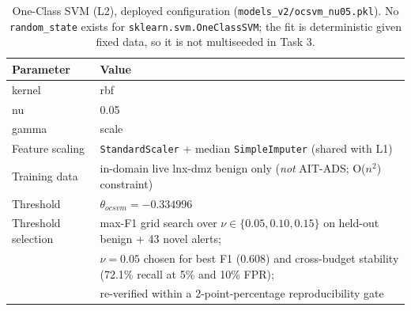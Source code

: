 \begin{table}[t]
\centering
\caption{One-Class SVM (L2), deployed configuration
(\texttt{models\_v2/ocsvm\_nu05.pkl}). No \texttt{random\_state} exists
for \texttt{sklearn.svm.OneClassSVM}; the fit is deterministic given fixed
data, so it is not multiseeded in Task 3.}
\label{tab:ocsvm-config}
\begin{tabular}{ll}
\toprule
Parameter & Value \\
\midrule
kernel & rbf \\
nu & 0.05 \\
gamma & scale \\
Feature scaling & \texttt{StandardScaler} + median \texttt{SimpleImputer} (shared with L1) \\
Training data & in-domain live lnx-dmz benign only (\emph{not} AIT-ADS; O($n^2$) constraint) \\
Threshold & $\theta_{ocsvm}=-0.334996$ \\
Threshold selection & max-F1 grid search over $\nu\in\{0.05,0.10,0.15\}$ on held-out benign + 43 novel alerts; \\
 & $\nu=0.05$ chosen for best F1 (0.608) and cross-budget stability (72.1\% recall at 5\% and 10\% FPR); \\
 & re-verified within a 2-point-percentage reproducibility gate \\
\bottomrule
\end{tabular}
\end{table}
